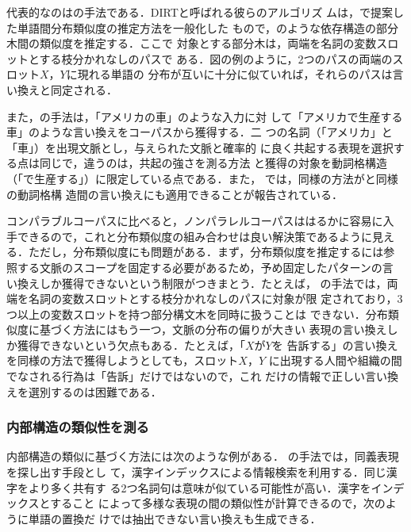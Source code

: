 代表的なのはの手法である．DIRTと呼ばれる彼らのアルゴリズ
ムは，\cite{lin:98:a}で提案した単語間分布類似度の推定方法を一般化した
もので，のような依存構造の部分木間の類似度を推定する．ここで
対象とする部分木は，両端を名詞の変数スロットとする枝分かれなしのパスで
ある．図の例のように，2つのパスの両端のスロット$X$，$Y$に現れる単語の
分布が互いに十分に似ていれば，それらのパスは言い換えと同定される．

また，の手法は，「アメリカの車」のような入力に対
して「アメリカで生産する車」のような言い換えをコーパスから獲得する．二
つの名詞（「アメリカ」と「車」）を出現文脈とし，与えられた文脈と確率的
に良く共起する表現を選択する点は同じで，違うのは，共起の強さを測る方法
と獲得の対象を動詞格構造（「で生産する」）に限定している点である．また，
\cite{torisawa:02:b}では，同様の方法が\cite{kondo:99}と同様の動詞格構
造間の言い換えにも適用できることが報告されている．

コンパラブルコーパスに比べると，ノンパラレルコーパスははるかに容易に入
手できるので，これと分布類似度の組み合わせは良い解決策であるように見え
る．ただし，分布類似度にも問題がある．まず，分布類似度を推定するには参
照する文脈のスコープを固定する必要があるため，予め固定したパターンの言
い換えしか獲得できないという制限がつきまとう．たとえば， 
の手法では，両端を名詞の変数スロットとする枝分かれなしのパスに対象が限
定されており，3つ以上の変数スロットを持つ部分構文木を同時に扱うことは
できない．分布類似度に基づく方法にはもう一つ，文脈の分布の偏りが大きい
表現の言い換えしか獲得できないという欠点もある．たとえば，「$X$が$Y$を
告訴する」の言い換えを同様の方法で獲得しようとしても，スロット$X$，$Y$ 
に出現する人間や組織の間でなされる行為は「告訴」だけではないので，これ
だけの情報で正しい言い換えを選別するのは困難である．

\subsubsection{内部構造の類似性を測る}

内部構造の類似に基づく方法には次のような例がある．
の手法では，同義表現を探し出す手段とし
て，漢字インデックスによる情報検索を利用する．同じ漢字をより多く共有す
る2つ名詞句は意味が似ている可能性が高い．漢字をインデックスとすること
によって多様な表現の間の類似性が計算できるので，次のように単語の置換だ
けでは抽出できない言い換えも生成できる．

